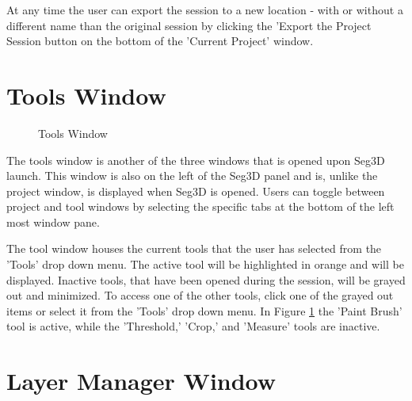 \documentclass[fleqn,11pt,openany]{book}
\begin{document}
At any time the user can export the session to a new location - with or without a different name than the original session by clicking the 'Export the Project Session button on the bottom of the  'Current Project' window.

\section{Tools Window}

\begin{figure}[b]
\caption{Tools Window}\label{fig:ToolWindow}
\end{figure}
The tools window is another of the three windows that is opened upon Seg3D launch.  
This window is also on the left of the Seg3D panel and is, unlike the project window, is displayed when Seg3D is opened.  
Users can toggle between project and tool windows by selecting the specific tabs at the bottom of the left most window pane.

The tool window houses the current tools that the user has selected from the 'Tools' drop down menu.  
The active tool will be highlighted in orange and will be displayed.  
Inactive tools, that have been opened during the session, will be grayed out and minimized.  
To access one of the other tools, click one of the grayed out items or select it from the 'Tools' drop down menu.  
In Figure \ref{fig:ToolWindow} the 'Paint Brush' tool is active, while the 'Threshold,' 'Crop,' and 'Measure' tools are inactive.



\section{Layer Manager Window}
\end{document}
